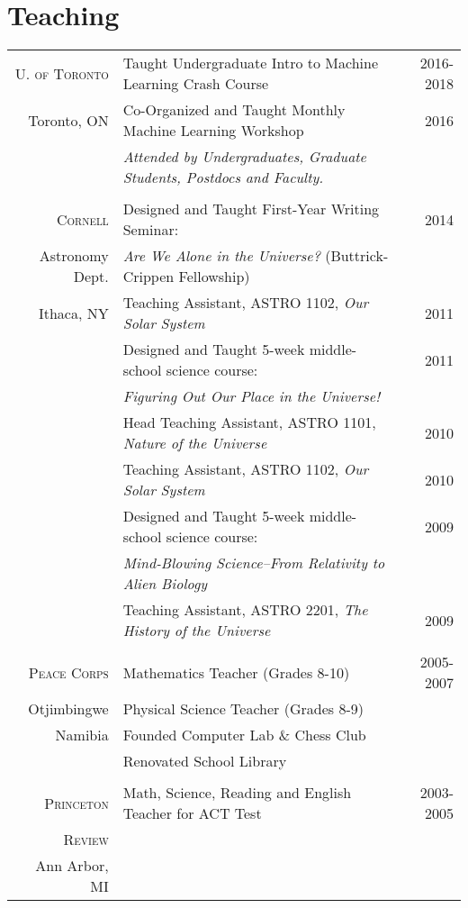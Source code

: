 \documentclass[10pt]{article} %
\begin{document}

\section{Teaching}

\begin{tabular}{>{\hfill}r|p{11.2cm}r}

\textsc{U. of Toronto}  & Taught Undergraduate Intro to Machine Learning Crash Course & 2016-2018 \\
Toronto, ON & Co-Organized and Taught Monthly Machine Learning Workshop & 2016 \\
& \hspace{0.25cm} {\it Attended by Undergraduates, Graduate Students, Postdocs and Faculty.} \\

\multicolumn{3}{c}{} \\
\textsc{Cornell} & Designed and Taught First-Year Writing Seminar: & 2014 \\
Astronomy Dept.& \hspace{0.25cm} {\it Are We Alone in the Universe?} (Buttrick-Crippen Fellowship) \\
Ithaca, NY & Teaching Assistant, ASTRO 1102, {\it Our Solar System} & 2011 \\
& Designed and Taught 5-week middle-school science course: & 2011\\
& \hspace{0.25cm} {\it Figuring Out Our Place in the Universe!} \\
& Head Teaching Assistant, ASTRO 1101, {\it Nature of the Universe} & 2010\\
& Teaching Assistant, ASTRO 1102, {\it Our Solar System} & 2010 \\
& Designed and Taught 5-week middle-school science course: & 2009\\
& \hspace{0.25cm} {\it Mind-Blowing Science--From Relativity to Alien Biology} \\
& Teaching Assistant, ASTRO 2201, {\it The History of the Universe} & 2009 \\
\multicolumn{3}{c}{} \\

\textsc{Peace Corps} & Mathematics Teacher (Grades 8-10) & 2005-2007\\
Otjimbingwe & Physical Science Teacher (Grades 8-9) \\
Namibia& Founded Computer Lab \& Chess Club \\
& Renovated School Library \\
\multicolumn{2}{c}{} \\

\textsc{Princeton} & Math, Science, Reading and English Teacher for ACT Test & 2003-2005\\
\textsc{Review} \\
Ann Arbor, MI
\end{tabular}
\end{document}
